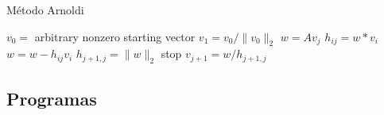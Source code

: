 \documentclass{article}
\begin{document}
\begin{algorithm}
\caption{Método Arnoldi}\label{alg:arnoldi}
\begin{algorithmic}[1]
\State $v_{0} = $ arbitrary nonzero starting vector
\State $v_{1} = v_{0}/\|v_{0}\|_{2}$ 
\State $w = Av_{j}$
\State $h_{ij} = w*v_{i}$
\State $w = w - h_{ij}v_{i}$
\EndFor
\State $h_{j+1,j} = \|w\|_{2}$
stop
\EndIf
\State $v_{j+1} = w/h_{j+1,j}$
\EndFor
\EndProcedure
\end{algorithmic}
\end{algorithm}
\subsection{Programas}









\end{document}

